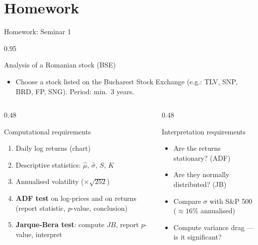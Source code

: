 \documentclass[9pt, aspectratio=169, t]{beamer}
\begin{document}
\section{Homework}

\begin{frame}[shrink=5]{Homework: Seminar 1}
    \begin{cminipage}{0.95\textwidth}
    \begin{block}{Analysis of a Romanian stock (BSE)}
    \begin{itemize}\setlength{\itemsep}{0pt}
        \item Choose a stock listed on the Bucharest Stock Exchange (e.g.: TLV, SNP, BRD, FP, SNG). Period: min.\ 3 years.
    \end{itemize}
    \end{block}
    \vspace{0.1cm}
    \begin{columns}[T]
    \begin{column}{0.48\textwidth}
    \begin{exampleblock}{Computational requirements}
    \begin{enumerate}\setlength{\itemsep}{0pt}
        \item Daily log returns (chart)
        \item Descriptive statistics: $\hat\mu$, $\hat\sigma$, $S$, $K$
        \item Annualised volatility ($\times \sqrt{252}$)
        \item \textbf{ADF test} on log-prices and on returns (report statistic, $p$-value, conclusion)
        \item \textbf{Jarque-Bera test}: compute $JB$, report $p$-value, interpret
    \end{enumerate}
    \end{exampleblock}
    \end{column}
    \begin{column}{0.48\textwidth}
    \begin{block}{Interpretation requirements}
    \begin{itemize}\setlength{\itemsep}{0pt}
        \item Are the returns stationary? (ADF)
        \item Are they normally distributed? (JB)
        \item Compare $\sigma$ with S\&P 500 ($\approx 16\%$ annualised)
        \item Compute variance drag --- is it significant?
    \end{itemize}

\end{block}
\end{column}
\end{columns}
\end{cminipage}
\end{frame}
\end{document}
